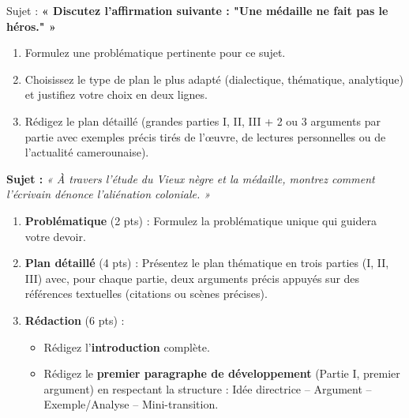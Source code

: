 \documentclass[11pt]{article}
\newcounter{popsec}
\newcounter{popsub}
\newcommand{\courssub}[1]{%
  \stepcounter{popsub}%
  \par\vspace{9pt}\noindent{\popxbold\fontsize{11.5}{13}\selectfont\color{popink}{\color{poporange}\thepopsec.\thepopsub}\hspace{6pt}#1}\par\nopagebreak\vspace{4pt}
}
\begin{document}
\begin{exercice}
Sujet : \textbf{« Discutez l'affirmation suivante : "Une médaille ne fait pas le héros." »}

\begin{enumerate}
\item Formulez une problématique pertinente pour ce sujet.
\item Choisissez le type de plan le plus adapté (dialectique, thématique, analytique) et justifiez votre choix en deux lignes.
\item Rédigez le plan détaillé (grandes parties I, II, III + 2 ou 3 arguments par partie avec exemples précis tirés de l'œuvre, de lectures personnelles ou de l'actualité camerounaise).
\end{enumerate}
\end{exercice}

\courssub{Je me prépare au Bac}

\begin{exercice}
\textbf{Sujet :} \textit{« À travers l'étude du Vieux nègre et la médaille, montrez comment l'écrivain dénonce l'aliénation coloniale. »}

\begin{enumerate}
\item \textbf{Problématique} (2 pts) : Formulez la problématique unique qui guidera votre devoir.
\item \textbf{Plan détaillé} (4 pts) : Présentez le plan thématique en trois parties (I, II, III) avec, pour chaque partie, deux arguments précis appuyés sur des références textuelles (citations ou scènes précises).
\item \textbf{Rédaction} (6 pts) : 
\begin{itemize}
\item[a)] Rédigez l'\textbf{introduction} complète.
\item[b)] Rédigez le \textbf{premier paragraphe de développement} (Partie I, premier argument) en respectant la structure : Idée directrice -- Argument -- Exemple/Analyse -- Mini-transition.
\end{itemize}
\end{enumerate}
\end{exercice}
\end{document}
